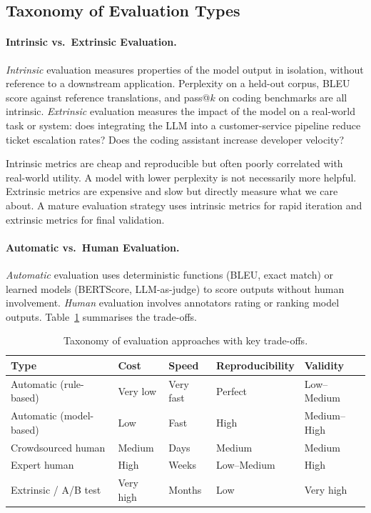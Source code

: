 \subsection{Taxonomy of Evaluation Types}
\label{taxonomy-of-evaluation-types}

\paragraph{Intrinsic vs.~Extrinsic Evaluation.}
\label{intrinsic-vs.-extrinsic-evaluation.}

\emph{Intrinsic} evaluation measures properties of the model output in isolation, without reference to a downstream application. Perplexity on a held-out corpus, BLEU score against reference translations, and pass@$k$ on coding benchmarks are all intrinsic. \emph{Extrinsic} evaluation measures the impact of the model on a real-world task or system: does integrating the LLM into a customer-service pipeline reduce ticket escalation rates? Does the coding assistant increase developer velocity?

\begin{intuitionbox}
Intrinsic metrics are cheap and reproducible but often poorly correlated with real-world utility. A model with lower perplexity is not necessarily more helpful. Extrinsic metrics are expensive and slow but directly measure what we care about. A mature evaluation strategy uses intrinsic metrics for rapid iteration and extrinsic metrics for final validation.
\end{intuitionbox}

\paragraph{Automatic vs.~Human Evaluation.}
\label{automatic-vs.-human-evaluation.}

\emph{Automatic} evaluation uses deterministic functions (BLEU, exact match) or learned models (BERTScore, LLM-as-judge) to score outputs without human involvement. \emph{Human} evaluation involves annotators rating or ranking model outputs. Table~\ref{tab:eval-taxonomy} summarises the trade-offs.

\begin{table}[ht!]
\centering
\caption{Taxonomy of evaluation approaches with key trade-offs.}
\label{tab:eval-taxonomy}
\begin{tabular}{@{}lp{3cm}p{3.2cm}p{3.2cm}p{3.5cm}@{}}
\toprule
\textbf{Type} & \textbf{Cost} & \textbf{Speed} & \textbf{Reproducibility} & \textbf{Validity} \\
\midrule
Automatic (rule-based) & Very low & Very fast & Perfect & Low--Medium \\
Automatic (model-based) & Low & Fast & High & Medium--High \\
Crowdsourced human & Medium & Days & Medium & Medium \\
Expert human & High & Weeks & Low--Medium & High \\
Extrinsic / A/B test & Very high & Months & Low & Very high \\
\bottomrule
\end{tabular}
\end{table}

